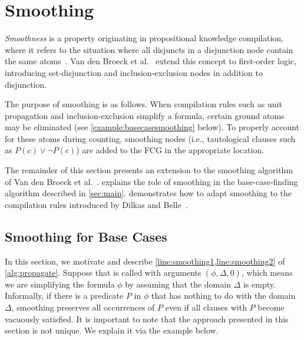 \documentclass{article}
\theoremstyle{remark}
\begin{document}
\section{Smoothing}\label{sec:smoothing}

\emph{Smoothness} is a property originating in propositional knowledge
compilation, where it refers to the situation where all disjuncts in a
disjunction node contain the same atoms~\cite{darwiche2001tractable}. Van den
Broeck et al.~ extend this concept to
first-order logic, introducing set-disjunction and inclusion-exclusion nodes in
addition to disjunction.

The purpose of smoothing is as follows. When compilation rules such as unit
propagation and inclusion-exclusion simplify a formula, certain ground atoms may
be eliminated (see \cref{example:basecasesmoothing} below). To properly account
for these atoms during counting, smoothing nodes (i.e., tautological clauses
such as $P(c) \lor \neg P(c)$) are added to the FCG in the appropriate location.

The remainder of this section presents an extension to the smoothing algorithm
of Van den Broeck et al.~.
 explains the role of smoothing in the base-case-finding
algorithm described in \cref{sec:main}.  demonstrates
how to adapt smoothing to the compilation rules introduced by Dilkas and
Belle~.

\subsection{Smoothing for Base Cases}\label{sec:smoothingbase}

In this section, we motivate and describe \cref{line:smoothing1,line:smoothing2}
of \cref{alg:propagate}. Suppose that \Propagate is called with arguments
$(\phi, \Delta, 0)$, which means we are simplifying the formula $\phi$ by
assuming that the domain $\Delta$ is empty. Informally, if there is a predicate
$P$ in $\phi$ that has nothing to do with the domain $\Delta$, smoothing
preserves all occurrences of $P$ even if all clauses with $P$ become vacuously
satisfied. It is important to note that the approach presented in this section
is not unique. We explain it via the example below.
\end{document}
